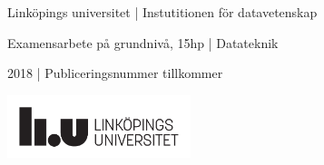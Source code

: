 \begin{titlepage}
	\vspace{10em}
\begin{minipage}{.85\linewidth}                                     
\begin{center}Linköpings universitet | Instutitionen för datavetenskap\par%
Examensarbete på grundnivå, 15hp | Datateknik\par%
2018 | Publiceringsnummer tillkommer

	\includegraphics[width=0.4\textwidth]{../Templates/liu_primary_black_sv.pdf}\\[2cm] %

\end{center}
\end{minipage}

	~

	\vfill\vfill



	\vfill %

\end{titlepage}


